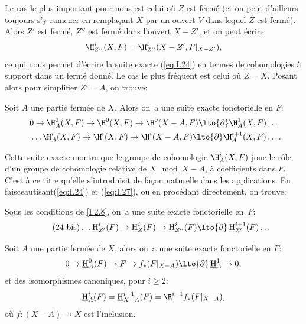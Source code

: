 Le cas le plus important pour nous est celui o\`u $Z$ est ferm\'e (et
on peut d'ailleurs toujours s'y ramener en rempla\c cant $X$ par
un ouvert $V$ dans lequel $Z$ est ferm\'e). Alors $Z'$ est ferm\'e,
$Z''$ est ferm\'e dans l'ouvert $X-Z'$, et on peut \'ecrire
\begin{equation} \label{eq:I.26} {\H^i_{Z''}(X, F)=\H^i_{Z''}(X-Z', F|_{X-Z'})},
\end{equation}
ce qui nous permet d'\'ecrire la suite exacte (\ref{eq:I.24}) en termes de cohomologies \`a support dans un ferm\'e donn\'e. Le cas le plus fr\'equent est celui o\`u $Z=X$. Posant alors pour simplifier $Z'=A$, on trouve:

\begin{corollaire} \label{I.2.9}
Soit $A$ une partie ferm\'ee de $X$. Alors on~a une suite exacte fonctorielle en $F$:
\begin{equation} \label{eq:I.27}
\begin{gathered}
0 \to \H^0_A(X, F) \to \H^0(X, F) \to \H^0(X-A, F) \lto{\partial} \H^1_A(X, F) \dots\\
\phantom{0}\dots \H^i_A(X, F) \to \H^i(X, F) \to \H^i(X-A, F) \lto{\partial} \H^{i+1}_A(X, F)\dots.
\end{gathered}
\end{equation}
\end{corollaire}

Cette suite exacte montre que le groupe de cohomologie $\H^i_A(X,
F)$ joue le r\^{o}le d'un groupe de cohomologie relative de $X\mod
X-A$, \`a coefficients dans $F$. C'est \`a ce titre qu'elle
s'introduisit de fa\c con naturelle dans les applications. En \og
faisceautisant\fg (\ref{eq:I.24}) et (\ref{eq:I.27}), ou en
proc\'edant directement, on trouve:

\begin{corollaire} \label{I.2.10}
Sous les conditions de \ref{I.2.8}, on~a une suite exacte fonctorielle en~$F$:
\begin{equation*} \label{eq:I.24bis} \tag{24 bis}
\dots \mathop{\underline{\mathrm{H}}}\nolimits^i_{Z'}(F) \to \mathop{\underline{\mathrm{H}}}\nolimits^i_{Z}(F) \to \mathop{\underline{\mathrm{H}}}\nolimits_{Z''}^i(F) \lto{\partial} \mathop{\underline{\mathrm{H}}}\nolimits_{Z'}^{i+1}(F) \dots
\end{equation*}
\end{corollaire}

\begin{corollaire} \label{I.2.11}
Soit $A$ une partie ferm\'ee de $X$, alors on~a une suite exacte fonctorielle en $F$:
\begin{equation} \label{eq:I.28}
0 \to \mathop{\underline{\mathrm{H}}}\nolimits_A^0(F) \to F \to f_*(F|_{X-A}) \lto{\partial} \mathop{\underline{\mathrm{H}}}\nolimits_A^1 \to 0,
\end{equation}
et des isomorphismes canoniques, pour $i\geq 2$:
\begin{equation} \label{eq:I.29}
\mathop{\underline{\mathrm{H}}}\nolimits_A^i(F)= \mathop{\underline{\mathrm{H}}}\nolimits_{X-A}^{i-1}(F)=\R^{i-1}f_*(F|_{X-A}),
\end{equation}
o\`u $f: (X-A) \to X$ est l'inclusion.
\end{corollaire}

